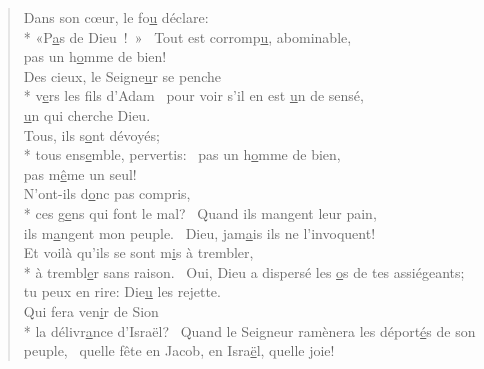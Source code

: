 
\begin{verse}
Dans son cœur, le fo\underline{u} déclare: \\*
«P\underline{a}s de Dieu ! »~\psalmstar
Tout est corromp\underline{u}, abominable, \\
pas un h\underline{o}mme de bien! \\

Des cieux, le Seigne\underline{u}r se penche \\*
v\underline{e}rs les fils d’Adam~\psalmstar
pour voir s’il en est \underline{u}n de sensé, \\
\underline{u}n qui cherche Dieu. \\

Tous, ils s\underline{o}nt dévoyés; \\*
tous ens\underline{e}mble, pervertis:~\psalmstar
pas un h\underline{o}mme de bien, \\
pas m\underline{ê}me un seul! \\

N’ont-ils d\underline{o}nc pas compris, \\*
ces g\underline{e}ns qui font le mal?~\psalmdagger
Quand ils mangent leur pain, \\
ils m\underline{a}ngent mon peuple.~\psalmstar
Dieu, jam\underline{a}is ils ne l’invoquent! \\

Et voilà qu’ils se sont m\underline{i}s à trembler, \\*
à trembl\underline{e}r sans raison.~\psalmstar
Oui, Dieu a dispersé les \underline{o}s de tes assiégeants; \\
tu peux en rire: Die\underline{u} les rejette. \\

Qui fera ven\underline{i}r de Sion \\*
la délivr\underline{a}nce d’Israël?~\psalmdagger
Quand le Seigneur ramènera les déport\underline{é}s de son peuple,~\psalmstar
quelle fête en Jacob, en Isra\underline{ë}l, quelle joie! \\
\end{verse}

